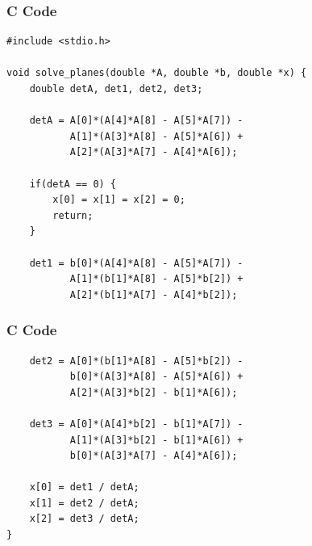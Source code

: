 \documentclass{beamer}
\begin{document}
\begin{frame}[fragile]
    \frametitle{C Code}
    \begin{lstlisting}
#include <stdio.h>

void solve_planes(double *A, double *b, double *x) {
    double detA, det1, det2, det3;

    detA = A[0]*(A[4]*A[8] - A[5]*A[7]) -
           A[1]*(A[3]*A[8] - A[5]*A[6]) +
           A[2]*(A[3]*A[7] - A[4]*A[6]);

    if(detA == 0) {
        x[0] = x[1] = x[2] = 0;
        return;
    }

    det1 = b[0]*(A[4]*A[8] - A[5]*A[7]) -
           A[1]*(b[1]*A[8] - A[5]*b[2]) +
           A[2]*(b[1]*A[7] - A[4]*b[2]);

    \end{lstlisting}
\end{frame}
\begin{frame}[fragile]
    \frametitle{C Code}
    \begin{lstlisting}
    det2 = A[0]*(b[1]*A[8] - A[5]*b[2]) -
           b[0]*(A[3]*A[8] - A[5]*A[6]) +
           A[2]*(A[3]*b[2] - b[1]*A[6]);

    det3 = A[0]*(A[4]*b[2] - b[1]*A[7]) -
           A[1]*(A[3]*b[2] - b[1]*A[6]) +
           b[0]*(A[3]*A[7] - A[4]*A[6]);

    x[0] = det1 / detA;
    x[1] = det2 / detA;
    x[2] = det3 / detA;
}

    \end{lstlisting}
\end{frame}
\end{document}
